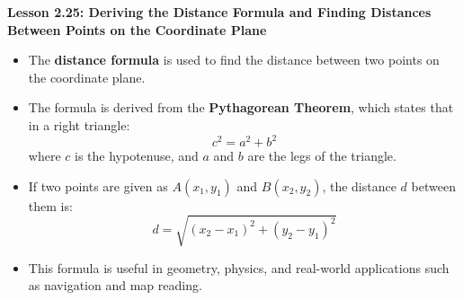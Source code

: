 \begin{center}
\textbf{Lesson 2.25: Deriving the Distance Formula and Finding Distances Between Points on the Coordinate Plane}
\end{center}

\vspace*{-1.5ex}

\begin{itemize}
    \item The \textbf{distance formula} is used to find the distance between two points on the coordinate plane.
    \item The formula is derived from the \textbf{Pythagorean Theorem}, which states that in a right triangle:
    \[
    c^2 = a^2 + b^2
    \]
    where $c$ is the hypotenuse, and $a$ and $b$ are the legs of the triangle.
    \item If two points are given as $A(x_1, y_1)$ and $B(x_2, y_2)$, the distance $d$ between them is:
    \[
    d = \sqrt{(x_2 - x_1)^2 + (y_2 - y_1)^2}
    \]
    \item This formula is useful in geometry, physics, and real-world applications such as navigation and map reading.
\end{itemize}
